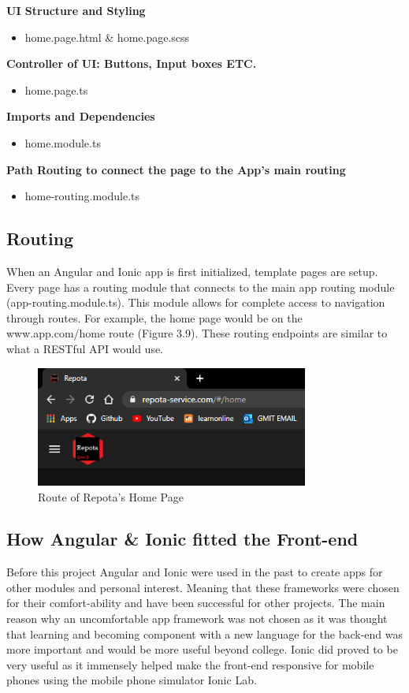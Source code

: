 \textbf{UI Structure and Styling}
\begin{itemize}
    \item home.page.html \& home.page.scss
\end{itemize} 

\textbf{Controller of UI: Buttons, Input boxes ETC.}
\begin{itemize}
    \item home.page.ts 
\end{itemize} 

\textbf{Imports and Dependencies}
\begin{itemize}
    \item home.module.ts
\end{itemize} 

\textbf{Path Routing to connect the page to the App's main routing}
\begin{itemize}
    \item home-routing.module.ts
\end{itemize} 

\subsection{Routing}
When an Angular and Ionic app is first initialized, template pages are setup. Every page has a routing module that connects to the main app routing module (app-routing.module.ts). This module allows for complete access to navigation through routes. For example, the home page would be on the www.app.com/home route (Figure 3.9). These routing endpoints are similar to what a RESTful API would use.

\begin{figure}[H]
    \caption{Route of Repota's Home Page}
    \label{image:homeRoute}
    \centering
    \includegraphics[width=0.8\textwidth]{images/misc/home-route.png}
\end{figure}

\subsection{How Angular \& Ionic fitted the Front-end}
Before this project Angular and Ionic were used in the past to create apps for other modules and personal interest. Meaning that these frameworks were chosen for their comfort-ability and have been successful for other projects. The main reason why an uncomfortable app framework was not chosen as it was thought that learning and becoming component with a new language for the back-end was more important and would be more useful beyond college. Ionic did proved to be very useful as it immensely helped make the front-end responsive for mobile phones using the mobile phone simulator Ionic Lab. 

